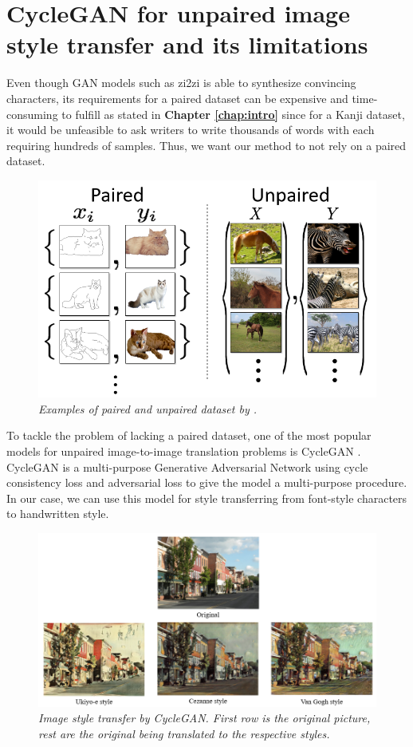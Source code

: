 \documentclass[12pt]{report}
\begin{document}
\section{CycleGAN for unpaired image style transfer and its limitations}

Even though GAN models such as zi2zi \cite{zi2zi} is able to synthesize convincing characters, its requirements for a paired dataset can be expensive and time-consuming to fulfill as stated in \textbf{Chapter \ref{chap:intro}} since for a Kanji dataset, it would be unfeasible to ask writers to write thousands of words with each requiring hundreds of samples. Thus, we want our method to not rely on a paired dataset.

\begin{figure}[H]
	\centering
	\includegraphics[scale=0.8]{pair-unpair-dataset}
	\caption{\textit{Examples of paired and unpaired dataset by \cite{cycle-gan}.}}
	\label{fig:pair-unpair-dataset}
\end{figure}

To tackle the problem of lacking a paired dataset, one of the most popular models for unpaired image-to-image translation problems is CycleGAN \cite{cycle-gan}. CycleGAN is a multi-purpose Generative Adversarial Network using cycle consistency loss and adversarial loss to give the model a multi-purpose procedure. In our case, we can use this model for style transferring from font-style characters to handwritten style.

\begin{figure}[h]
	\centering
	\includegraphics[scale=0.65]{style-transfer}
	\caption{\textit{Image style transfer by CycleGAN. First row is the original picture, rest are the original being translated to the respective styles.}}
	\label{fig:style-transfer}
\end{figure}
\end{document}
